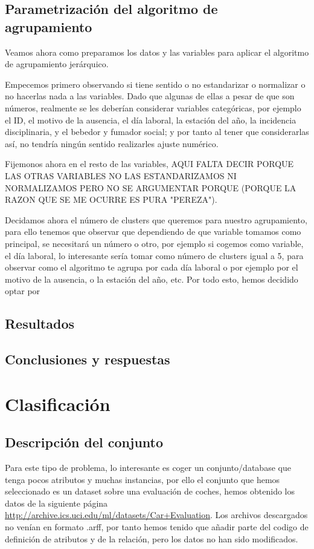 \documentclass[a4paper, 11pt, twoside, openany, onecolumn, final]{memoir}
\begin{document}
	\section{Parametrización del algoritmo de agrupamiento}
	Veamos ahora como preparamos los datos y las variables para aplicar el algoritmo de agrupamiento jerárquico.
	
	Empecemos primero observando si tiene sentido o no estandarizar o normalizar o no hacerlas nada a las variables. Dado que algunas de ellas a pesar de que son números, realmente se les deberían considerar variables categóricas, por ejemplo el ID, el motivo de la ausencia, el día laboral, la estación del año, la incidencia disciplinaria, y el bebedor y fumador social; y por tanto al tener que considerarlas así, no tendría ningún sentido realizarles ajuste numérico.
	
	Fijemonos ahora en el resto de las variables,   AQUI FALTA DECIR PORQUE LAS OTRAS VARIABLES NO LAS ESTANDARIZAMOS NI NORMALIZAMOS PERO NO SE ARGUMENTAR PORQUE (PORQUE LA RAZON QUE SE ME OCURRE ES PURA "PEREZA").
	
	Decidamos ahora el número de clusters que queremos para nuestro agrupamiento, para ello tenemos que observar que dependiendo de que variable tomamos como principal, se necesitará un número o otro, por ejemplo si cogemos como variable, el día laboral, lo interesante sería tomar como número de clusters igual a 5, para observar como el algoritmo te agrupa por cada día laboral o por ejemplo por el motivo de la ausencia, o la estación del año, etc.
	Por todo esto, hemos decidido optar por 
	\section{Resultados}
	\section{Conclusiones y respuestas}
	\chapter{Clasificación}
		\section{Descripción del conjunto}
		Para este tipo de problema, lo interesante es coger un conjunto/database que tenga pocos atributos y muchas instancias, por ello el conjunto que hemos seleccionado es un dataset sobre una evaluación de coches, hemos obtenido los datos de la siguiente página \url{http://archive.ics.uci.edu/ml/datasets/Car+Evaluation}. Los archivos descargados no venían en formato .arff, por tanto hemos tenido que añadir parte del codigo de definición de atributos y de la relación, pero los datos no han sido modificados.
		
\end{document}
